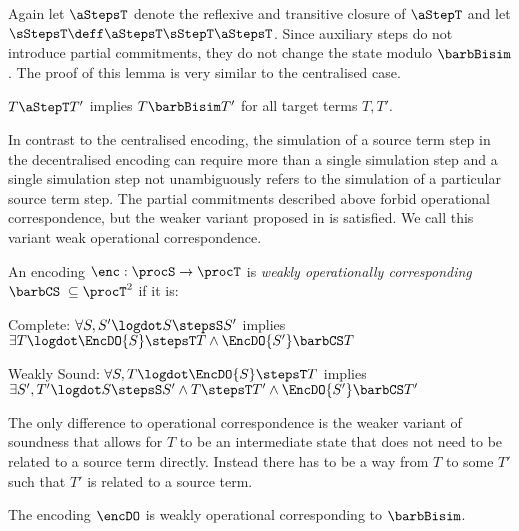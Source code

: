 \documentclass[copyright,creativecommons]{eptcs}
\begin{document}
\noindent
Again let $ \aStepsT $ denote the reflexive and transitive closure of $ \aStepT $ and let $ \sStepsT \deff \aStepsT \sStepT \aStepsT $.
Since auxiliary steps do not introduce partial commitments, they do not change the state modulo $ \barbBisim $. The proof of this lemma is very similar to the centralised case.

\begin{lemma}
	$ T \aStepT T' $ implies $ T \barbBisim T' $ for all target terms $ T, T' $.
	\label{lem:auxStepsDecentral}
\end{lemma}

In contrast to the centralised encoding, the simulation of a source term step in the decentralised encoding can require more than a single simulation step and a single simulation step not unambiguously refers to the simulation of a particular source term step. The partial commitments described above forbid operational correspondence, but the weaker variant proposed in \cite{gorla10} is satisfied. We call this variant weak operational correspondence.

\begin{definition}
	$ $\\
	An encoding $ \enc: \procS \to \procT $ is \emph{weakly operationally corresponding} \wrt $ \barbCS \; \subseteq \procT^2 $ if it is:
	\begin{compactitem}
		\item[\; Complete:] $ \forall S, S' \logdot S \stepsS S' $ implies $ \exists T \logdot \EncDO{S} \stepsT T \wedge \EncDO{S'} \barbCS T $
		\item[\; Weakly Sound:] $ \forall S, T \logdot \EncDO{S} \stepsT T $ implies $ \exists S', T' \logdot S \stepsS S' \wedge T \stepsT T' \wedge \EncDO{S'} \barbCS T' $
	\end{compactitem}
\end{definition}

The only difference to operational correspondence is the weaker variant of soundness that allows for $ T $ to be an intermediate state that does not need to be related to a source term directly. Instead there has to be a way from $ T $ to some $ T' $ such that $ T' $ is related to a source term.

\begin{theorem}
	The encoding $ \encDO $ is weakly operational corresponding \wrt to $ \barbBisim $.
	\label{thm:operationalCorrespondenceDecentral}
\end{theorem}
\end{document}
